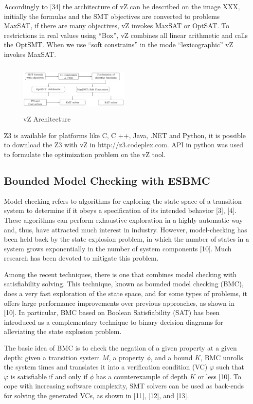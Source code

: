 Accordingly to [34] the architecture of vZ can be described on the image XXX, initially the formulas and the SMT objectives are converted to problems MaxSAT, if there are many objectives, vZ invokes MaxSAT or OptSAT. To restrictions in real values using “Box”, vZ combines all linear arithmetic and calls the OptSMT. When we use “soft constrains” in the mode “lexicographic” vZ invokes MaxSAT.
\begin{figure}[ht]
	\centering
  \includegraphics[width=0.49\textwidth, height=95px]{Image/vzArch.png} 
	\caption{vZ Architecture}
	\label{fig2}
\end{figure}

Z3 is available for platforms like C, C ++, Java, .NET and Python, it is possible to download the Z3 with vZ in http://z3.codeplex.com. API in python was used to formulate the optimization problem on the vZ tool. 


\subsection{Bounded Model Checking with ESBMC}
Model checking refers to algorithms for exploring the state space of a transition system to determine if it obeys a speciﬁcation of its intended behavior [3], [4]. These algorithms can perform exhaustive exploration in a highly automatic way and, thus, have attracted much interest in industry. However, model-checking has been held back by the state explosion problem, in which the number of states in a system grows exponentially in the number of system components [10]. Much research has been devoted to mitigate this problem.

Among the recent techniques, there is one that combines model checking with satisﬁability solving. This technique, known as bounded model checking (BMC), does a very fast exploration of the state space, and for some types of problems, it offers large performance improvements over previous approaches, as shown in [10]. In particular, BMC based on Boolean Satisfiability (SAT) has been introduced as a complementary technique to binary decision diagrams for alleviating the state explosion problem. 

The basic idea of BMC is to check the negation of a given property at a given depth: given a transition system $ M $, a property $ \phi $, and a bound $ K $, BMC unrolls the system  times and translates it into a verification condition (VC) $ \varphi $  such that $ \varphi $   is satisfiable if and only if $ \phi $ has a counterexample of depth $ K $ or less [10]. To cope with increasing software complexity, SMT solvers can be used as back-ends for solving the generated VCs, as shown in [11], [12], and [13]. 

